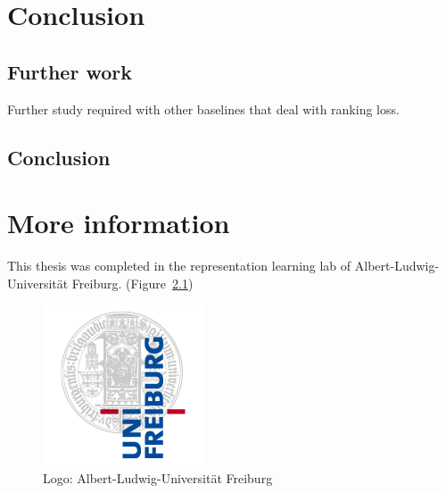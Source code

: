 \documentclass[11pt]{report}
\begin{document}
\chapter{Conclusion}


\section{Further work}
Further study required with other baselines that deal with ranking loss.

 
\section{Conclusion}




\appendix
\chapter{More information}
This thesis was completed in the representation learning lab of Albert-Ludwig-Universität Freiburg.  (Figure~\ref{fig:UniLogo})

\begin{figure}[htb]
  \centering
    \includegraphics[scale=0.35]{images/logo}
    \caption{Logo: Albert-Ludwig-Universität Freiburg}
    \label{fig:UniLogo}
\end{figure}
\end{document}
